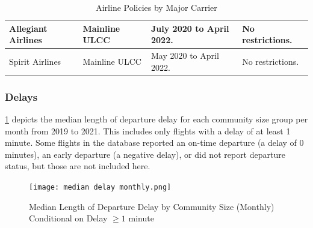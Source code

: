 \documentclass[11pt]{article}
\begin{document}
\begin{table}[htbp!]
\begin{tabular}{|p{4cm}|p{4cm}|p{4cm}|p{4cm}|}
Allegiant Airlines    & Mainline ULCC         & July 2020 to April 2022.  & No restrictions.                                                                                                                                                                                                                                                   \\ \hline
Spirit Airlines       & Mainline ULCC         & May 2020 to April 2022.   & No restrictions.                                                                                                                                                                                                                                                   \\ \hline
\end{tabular}
\caption{Airline Policies by Major Carrier}
\label{airline_policies_table}
\end{table}

\subsubsection{Delays}

\cref{median_delay_monthly} depicts the median length of departure delay for each community size group per month from 2019 to 2021. This includes only flights with a delay of at least 1 minute. Some flights in the database reported an on-time departure (a delay of 0 minutes), an early departure (a negative delay), or did not report departure status, but those are not included here. 

\begin{figure}[htbp!]
\centerline{\texttt{[image: median delay monthly.png]}}
\caption{Median Length of Departure Delay by Community Size (Monthly) Conditional on Delay $\geq 1$ minute}
\label{median_delay_monthly}
\end{figure}
\end{document}

